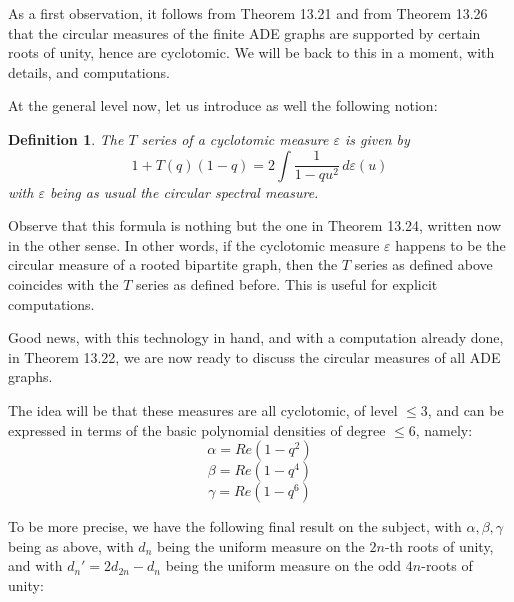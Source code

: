 \documentclass[12pt]{amsbook}
\newtheorem{definition}[theorem]{Definition}
\begin{document}
As a first observation, it follows from Theorem 13.21 and from Theorem 13.26 that the circular measures of the finite ADE graphs are supported by certain roots of unity, hence are cyclotomic. We will be back to this in a moment, with details, and computations.

\bigskip

At the general level now, let us introduce as well the following notion:

\begin{definition}
The $T$ series of a cyclotomic measure $\varepsilon$ is given by
$$1+T(q)(1-q)=2\int\frac{1}{1-qu^2}\,d\varepsilon(u)$$
with $\varepsilon$ being as usual the circular spectral measure.
\end{definition}

Observe that this formula is nothing but the one in Theorem 13.24, written now in the other sense. In other words, if the cyclotomic measure $\varepsilon$ happens to be the circular measure of a rooted bipartite graph, then the $T$ series as defined above coincides with the $T$ series as defined before. This is useful for explicit computations.

\bigskip

Good news, with this technology in hand, and with a computation already done, in Theorem 13.22, we are now ready to discuss the circular measures of all ADE graphs. 

\bigskip

The idea will be that these measures are all cyclotomic, of level $\leq 3$, and can be expressed in terms of the basic polynomial densities of degree $\leq 6$, namely:
$$\alpha=Re(1-q^2)$$
$$\beta=Re(1-q^4)$$
$$\gamma=Re(1-q^6)$$

To be more precise, we have the following final result on the subject, with $\alpha,\beta,\gamma$ being as above, with $d_n$ being the uniform measure on the $2n$-th roots of unity, and with $d_n'=2d_{2n}-d_n$ being the uniform measure on the odd $4n$-roots of unity:

\end{document}

